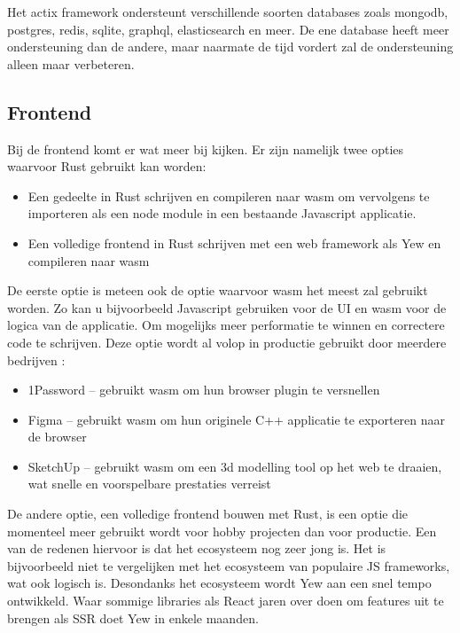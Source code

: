 Het actix framework ondersteunt verschillende soorten databases zoals mongodb, postgres, redis,
sqlite, graphql, elasticsearch en meer. De ene database heeft meer ondersteuning dan de andere, maar
naarmate de tijd vordert zal de ondersteuning alleen maar verbeteren. 

\subsection{Frontend}

Bij de frontend komt er wat meer bij kijken. Er zijn namelijk twee opties waarvoor Rust gebruikt kan
worden: 
\begin{itemize}
  \item Een gedeelte in Rust schrijven en compileren naar wasm om vervolgens te importeren als een node
    module in een bestaande Javascript applicatie. 
  \item Een volledige frontend in Rust schrijven met een web framework als Yew en compileren naar wasm 
\end{itemize}               

\clearpage

De eerste optie is meteen ook de optie waarvoor wasm het meest zal gebruikt worden. Zo kan u
bijvoorbeeld Javascript gebruiken voor de UI en wasm voor de logica van de applicatie. Om mogelijks
meer performatie te winnen en correctere code te schrijven. Deze optie wordt al volop in productie
gebruikt door meerdere bedrijven \cite{made_with_wasm}: 
\begin{itemize}
  \item 1Password – gebruikt wasm om hun browser plugin te versnellen 
  \item Figma – gebruikt wasm om hun originele C++ applicatie te exporteren naar de browser 
  \item SketchUp – gebruikt wasm om een 3d modelling tool op het web te draaien, wat snelle en
    voorspelbare prestaties verreist 
\end{itemize}

De andere optie, een volledige frontend bouwen met Rust, is een optie die momenteel meer gebruikt
wordt voor hobby projecten dan voor productie. Een van de redenen hiervoor is dat het ecosysteem nog
zeer jong is. Het is bijvoorbeeld niet te vergelijken met het ecosysteem van populaire JS
frameworks, wat ook logisch is. Desondanks het ecosysteem wordt Yew aan een snel tempo ontwikkeld.
Waar sommige libraries als React jaren over doen om features uit te brengen als SSR doet Yew in
enkele maanden.

